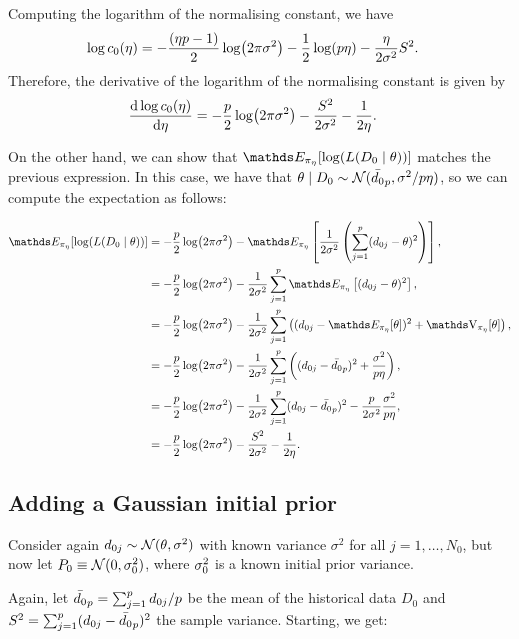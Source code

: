 Computing the logarithm of the normalising constant, we have
\begin{align*}
    \log c_0(\eta) &= -\dfrac{(\eta p - 1)}{2}\log(2\pi\sigma^2) - \dfrac{1}{2}\log(p\eta) - \dfrac{\eta}{2\sigma^2}S^2.
\end{align*}
Therefore, the derivative of the logarithm of the normalising constant is given by
\begin{align*}
    \dfrac{\dd \log c_0(\eta)}{\dd \eta} &= -\dfrac{p}{2}\log(2\pi\sigma^2) - \dfrac{S^2}{2\sigma^2}  - \dfrac{1}{2\eta}.
\end{align*}

On the other hand, we can show that $\bE_{\pi_\eta}[\log(L(D_0 \mid \theta))]$ matches the previous expression. In this case, we have that $\theta \mid D_0 \sim \mathcal{N}(\bar{d_0}_p, \sigma^2/p\eta)$, so we can compute the expectation as follows:

\begin{align*}
    \bE_{\pi_\eta}[\log(L(D_0 \mid \theta))] &= -\dfrac{p}{2}\log(2\pi\sg) - \bE_{\pi_\eta}\left[\dfrac{1}{2\sg}\left(\sum_{j=1}^{p}(d_{0j} - \theta)^2\right)\right], \\
    &= -\dfrac{p}{2}\log(2\pi\sg) - \dfrac{1}{2\sg}\sum_{j=1}^{p}\bE_{\pi_\eta}\left[(d_{0j} - \theta)^2\right], \\
    &= -\dfrac{p}{2}\log(2\pi\sg) - \dfrac{1}{2\sg}\sum_{j=1}^{p}\left((d_{0j} - \bE_{\pi_\eta}[\theta])^2 + \vr_{\pi_\eta}[\theta]\right), \\
    &= -\dfrac{p}{2}\log(2\pi\sg) - \dfrac{1}{2\sg}\sum_{j=1}^{p}\left((d_{0j} - \dbar)^2 + \dfrac{\sg}{p\eta} \right), \\
    &= -\dfrac{p}{2}\log(2\pi\sg) - \dfrac{1}{2\sg}\sum_{j=1}^{p}(d_{0j} - \dbar)^2 - \dfrac{p}{2\sg}\dfrac{\sg}{p\eta}, \\
    &= -\dfrac{p}{2}\log(2\pi\sg) - \dfrac{S^2}{2\sg} - \dfrac{1}{2\eta}. \\
\end{align*}


\subsection{Adding a Gaussian initial prior}

Consider again $d_{0j} \sim \mathcal{N}(\theta, \sigma^2)$ with known variance $\sigma^2$ for all $j = 1,\ldots, N_0$, but now let $P_0 \equiv \mathcal{N}(0, \sigma_0^2)$, where $\sigma_0^2$ is a known initial prior variance.

    Again, let $\bar{d_0}_p = \sum_{j=1}^{p} d_{0j}/p$ be the mean of the historical data $D_0$ and $S^2 = \sum_{j=1}^{p} (d_{0j} - \bar{d_0}_p)^2$ the sample variance. Starting, we get:

